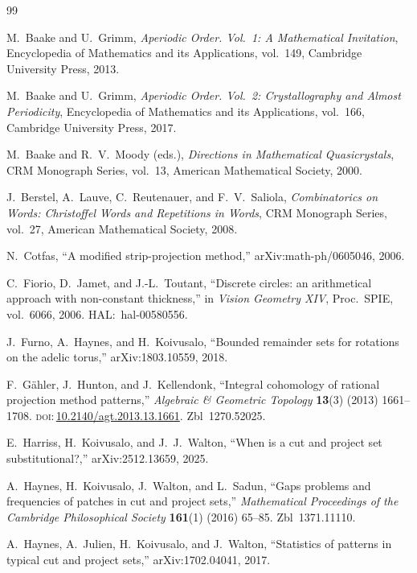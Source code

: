 \documentclass[11pt]{article}
\theoremstyle{plain}
\theoremstyle{remark}
\begin{document}
\begin{thebibliography}{99}

M.~Baake and U.~Grimm,
\emph{Aperiodic Order. Vol.~1: A Mathematical Invitation},
Encyclopedia of Mathematics and its Applications, vol.~149,
Cambridge University Press, 2013.

M.~Baake and U.~Grimm,
\emph{Aperiodic Order. Vol.~2: Crystallography and Almost Periodicity},
Encyclopedia of Mathematics and its Applications, vol.~166,
Cambridge University Press, 2017.

M.~Baake and R.~V.~Moody (eds.),
\emph{Directions in Mathematical Quasicrystals},
CRM Monograph Series, vol.~13, American Mathematical Society, 2000.

J.~Berstel, A.~Lauve, C.~Reutenauer, and F.~V.~Saliola,
\emph{Combinatorics on Words: Christoffel Words and Repetitions in Words},
CRM Monograph Series, vol.~27, American Mathematical Society, 2008.

N.~Cotfas,
``A modified strip-projection method,''
arXiv:math-ph/0605046, 2006.

C.~Fiorio, D.~Jamet, and J.-L.~Toutant,
``Discrete circles: an arithmetical approach with non-constant thickness,''
in \emph{Vision Geometry XIV}, Proc.\ SPIE, vol.~6066, 2006.
HAL:~hal-00580556.

J.~Furno, A.~Haynes, and H.~Koivusalo,
``Bounded remainder sets for rotations on the adelic torus,''
arXiv:1803.10559, 2018.

F.~G\"ahler, J.~Hunton, and J.~Kellendonk,
``Integral cohomology of rational projection method patterns,''
\emph{Algebraic \& Geometric Topology} \textbf{13}(3) (2013) 1661--1708.
\textsc{doi}:\,\href{https://doi.org/10.2140/agt.2013.13.1661}{10.2140/agt.2013.13.1661}.
Zbl~1270.52025.

E.~Harriss, H.~Koivusalo, and J.~J.~Walton,
``When is a cut and project set substitutional?,''
arXiv:2512.13659, 2025.

A.~Haynes, H.~Koivusalo, J.~Walton, and L.~Sadun,
``Gaps problems and frequencies of patches in cut and project sets,''
\emph{Mathematical Proceedings of the Cambridge Philosophical Society}
\textbf{161}(1) (2016) 65--85.
Zbl~1371.11110.

A.~Haynes, A.~Julien, H.~Koivusalo, and J.~Walton,
``Statistics of patterns in typical cut and project sets,''
arXiv:1702.04041, 2017.


\end{thebibliography}
\end{document}
